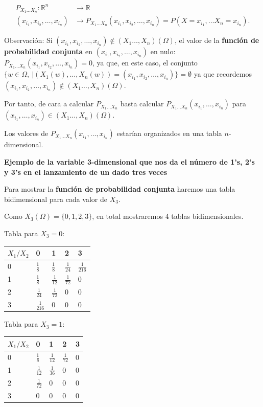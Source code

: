 \documentclass[]{book}
\begin{document}
\[
\begin{array}{rl}
P_{X_1\ldots X_n}: \mathbb{R}^n & \longrightarrow \mathbb{R}\\
(x_{i_1},x_{i_2},\ldots,x_{i_n}) & \longrightarrow P_{X_1\ldots X_n}(x_{i_1},x_{i_2},\ldots,x_{i_n})=P(X= x_{i_1},\ldots X_n= x_{i_n}).
\end{array}
\]

Observación:
Si \((x_{i_1},x_{i_2},\ldots,x_{i_n})\not\in (X_1\ldots,X_n)(\Omega)\), el valor de la \textbf{función de probabilidad conjunta} en \((x_{i_1},x_{i_2},\ldots,x_{i_n})\) en nulo: \(P_{X_1\ldots X_n}(x_{i_1},x_{i_2},\ldots,x_{i_n})=0\), ya que, en este caso, el conjunto \(\{w\in\Omega,\ | (X_1(w),\ldots,X_n(w))=(x_{i_1},x_{i_2},\ldots,x_{i_n})\}=\emptyset\) ya que recordemos \((x_{i_1},x_{i_2},\ldots,x_{i_n})\not\in (X_1\ldots,X_n)(\Omega)\).

Por tanto, de cara a calcular \(P_{X_1\ldots X_n}\) basta calcular \(P_{X_1\ldots X_n}(x_{i_1},\ldots,x_{i_n})\) para \((x_{i_1},\ldots,x_{i_n})\in (X_1\ldots,X_n)(\Omega)\).

Los valores de \(P_{X_1\ldots X_n}(x_{i_1},\ldots,x_{i_n})\) estarían organizados en una tabla \(n\)-dimensional.

\textbf{Ejemplo de la variable 3-dimensional que nos da el número de 1's, 2's y 3's en el lanzamiento de un dado tres veces}

Para mostrar la \textbf{función de probabilidad conjunta} haremos una tabla bidimensional para cada valor de \(X_3\).

Como \(X_3(\Omega)=\{0,1,2,3\}\), en total mostraremos 4 tablas bidimensionales.

Tabla para \(X_3=0\):

\begin{longtable}[]{@{}lllll@{}}
\toprule
\(X_1/X_2\) & 0 & 1 & 2 & 3\tabularnewline
\midrule
\endhead
0 & \(\frac{1}{8}\) & \(\frac{1}{8}\) & \(\frac{1}{24}\) & \(\frac{1}{216}\)\tabularnewline
1 & \(\frac{1}{8}\) & \(\frac{1}{12}\) & \(\frac{1}{72}\) & \(0\)\tabularnewline
2 & \(\frac{1}{24}\) & \(\frac{1}{72}\) & \(0\) & \(0\)\tabularnewline
3 & \(\frac{1}{216}\) & \(0\) & \(0\) & \(0\)\tabularnewline
\bottomrule
\end{longtable}

Tabla para \(X_3=1\):

\begin{longtable}[]{@{}lllll@{}}
\toprule
\(X_1/X_2\) & 0 & 1 & 2 & 3\tabularnewline
\midrule
\endhead
0 & \(\frac{1}{8}\) & \(\frac{1}{12}\) & \(\frac{1}{72}\) & \(0\)\tabularnewline
1 & \(\frac{1}{12}\) & \(\frac{1}{36}\) & \(0\) & \(0\)\tabularnewline
2 & \(\frac{1}{72}\) & \(0\) & \(0\) & \(0\)\tabularnewline
3 & \(0\) & \(0\) & \(0\) & \(0\)\tabularnewline
\bottomrule
\end{longtable}
\end{document}
